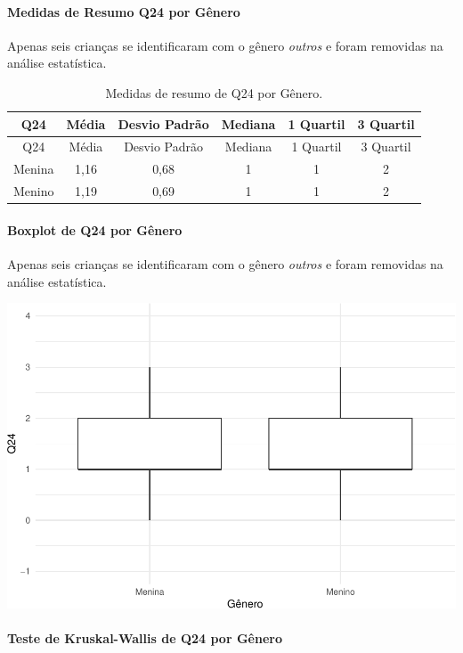 \documentclass[]{article}
\let\oldparagraph\paragraph
\renewcommand{\paragraph}[1]{\oldparagraph{#1}\mbox{}}
\begin{document}
\hypertarget{medidas-de-resumo-q24-por-guxeanero}{%
\paragraph{Medidas de Resumo Q24 por Gênero}\label{medidas-de-resumo-q24-por-guxeanero}}

Apenas seis crianças se identificaram com o gênero \emph{outros} e foram removidas na análise estatística.

\begin{longtable}[]{@{}cccccc@{}}
\caption{\label{tab:unnamed-chunk-617}Medidas de resumo de Q24 por Gênero.}\tabularnewline
\toprule
Q24 & Média & Desvio Padrão & Mediana & 1 Quartil & 3 Quartil\tabularnewline
\midrule
\endfirsthead
\toprule
Q24 & Média & Desvio Padrão & Mediana & 1 Quartil & 3 Quartil\tabularnewline
\midrule
\endhead
Menina & 1,16 & 0,68 & 1 & 1 & 2\tabularnewline
Menino & 1,19 & 0,69 & 1 & 1 & 2\tabularnewline
\bottomrule
\end{longtable}

\hypertarget{boxplot-de-q24-por-guxeanero}{%
\paragraph{Boxplot de Q24 por Gênero}\label{boxplot-de-q24-por-guxeanero}}

Apenas seis crianças se identificaram com o gênero \emph{outros} e foram removidas na análise estatística.

\begin{center}\includegraphics[width=0.75\linewidth]{relatorio_covid19_files/figure-latex/unnamed-chunk-618-1} \end{center}

\hypertarget{teste-de-kruskal-wallis-de-q24-por-guxeanero}{%
\paragraph{Teste de Kruskal-Wallis de Q24 por Gênero}\label{teste-de-kruskal-wallis-de-q24-por-guxeanero}}
\end{document}
